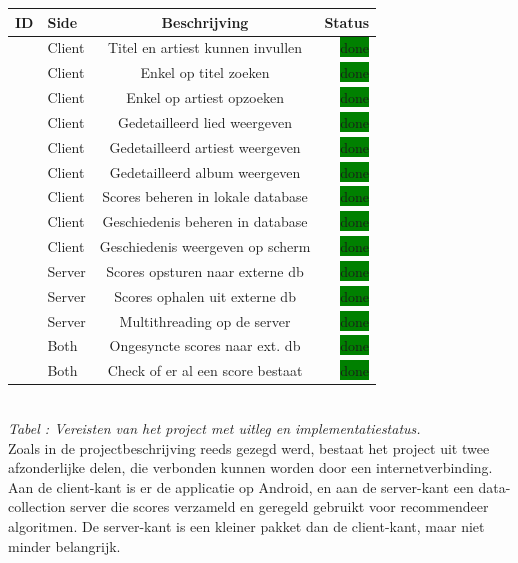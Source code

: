 \documentclass[11pt,a4paper]{article}
\newcommand{\boxgreen}{\colorbox{green}{\color{black}done}}
\newcommand{\boxyellow}{\colorbox{yellow}{\color{black}in progress}}
\newcommand{\boxred}{\colorbox{red}{\color{black}NYI}}
\newcounter{reqc}
\newcommand{\reqID} {%
   \stepcounter{reqc}%
   \thereqc}
\newcounter{tabc}
\newcommand{\tabID} {%
   \stepcounter{tabc}%
   \thetabc}
\begin{document}
	\begin{tabular}{| l | l | c | r |}
	\hline
	ID 		& 	Side	&	Beschrijving						& Status 		\\ \hline \hline
	\reqID	&	Client	&	Titel en artiest kunnen invullen	& \boxgreen 	\\ \hline
	\reqID 	&	Client	&	Enkel op titel zoeken				& \boxgreen		\\ \hline
	\reqID	& 	Client	&	Enkel op artiest opzoeken 			& \boxgreen		\\ \hline
	\reqID 	& 	Client	&	Gedetailleerd lied weergeven		& \boxgreen 	\\ \hline
	\reqID 	& 	Client	&	Gedetailleerd artiest weergeven		& \boxgreen 	\\ \hline
	\reqID 	& 	Client	&	Gedetailleerd album weergeven		& \boxgreen 	\\ \hline
	\reqID	& 	Client	&	Scores beheren in lokale database	& \boxgreen  	\\ \hline
	\reqID	& 	Client	&	Geschiedenis beheren in database	& \boxgreen  	\\ \hline
	\reqID	& 	Client	&	Geschiedenis weergeven op scherm	& \boxgreen  	\\ \hline
	\reqID	& 	Server	&	Scores opsturen naar externe db		& \boxgreen		\\ \hline
	\reqID	&	Server	&	Scores ophalen uit externe db		& \boxgreen		\\ \hline
	\reqID	& 	Server	& 	Multithreading op de server			& \boxgreen		\\ \hline
	\reqID	& 	Both	& 	Ongesyncte scores naar ext. db		& \boxgreen		\\ \hline
	\reqID	&	Both	&	Check of er al een score bestaat	& \boxgreen		\\ \hline
	
	\end{tabular} \\ \newline
	\small \textit{Tabel \tabID : Vereisten van het project met uitleg en implementatiestatus.} \normalsize
	\\ \newline
	Zoals in de projectbeschrijving reeds gezegd werd, bestaat het project uit twee afzonderlijke delen, die verbonden kunnen worden door een internetverbinding. Aan de client-kant is er de applicatie op Android, en aan de server-kant een data-collection server die scores verzameld en geregeld gebruikt voor recommendeer algoritmen. De server-kant is een kleiner pakket dan de client-kant, maar niet minder belangrijk. 
	\\ \newline
\end{document}
